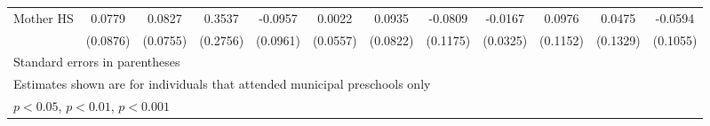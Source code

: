\begin{table}[htbp]
\begin{tabular}{l*{11}{c}}
\addlinespace
Mother HS   &      0.0779         &      0.0827         &      0.3537         &     -0.0957         &      0.0022         &      0.0935         &     -0.0809         &     -0.0167         &      0.0976         &      0.0475         &     -0.0594         \\
            &    (0.0876)         &    (0.0755)         &    (0.2756)         &    (0.0961)         &    (0.0557)         &    (0.0822)         &    (0.1175)         &    (0.0325)         &    (0.1152)         &    (0.1329)         &    (0.1055)         \\
\bottomrule
\multicolumn{12}{l}{\footnotesize Standard errors in parentheses}\\
\multicolumn{12}{l}{\footnotesize Estimates shown are for individuals that attended municipal preschools only}\\
\multicolumn{12}{l}{\footnotesize \sym{*} \(p<0.05\), \sym{**} \(p<0.01\), \sym{***} \(p<0.001\)}\\
\end{tabular}
\end{table}
